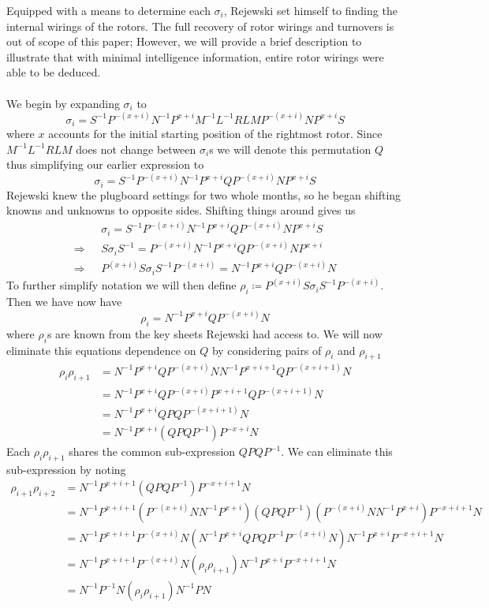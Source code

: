 Equipped with a means to determine each $\sigma_i$, Rejewski set
himself to finding the internal wirings of the rotors. The full
recovery of rotor wirings and turnovers is out of scope of this paper;
However, we will provide a brief description to illustrate that with
minimal intelligence information, entire rotor wirings were able to be deduced.
\\\\We begin by expanding $\sigma_i$ to
\[
	\sigma_i = S^{-1}P^{-(x+i)}N^{-1}P^{x+i}M^{-1}L^{-1}RLMP^{-(x+i)}NP^{x+i}S
\]
where $x$ accounts for the initial starting position of the rightmost rotor.
Since $M^{-1}L^{-1}RLM$ does not change between $\sigma_i$s we will
denote this permutation $Q$ thus simplifying our earlier expression to
\[
	\sigma_i = S^{-1}P^{-(x+i)}N^{-1}P^{x+i}QP^{-(x+i)}NP^{x+i}S
\]
Rejewski knew the plugboard settings for two whole months, so he
began shifting knowns and unknowns to opposite sides. Shifting things
around gives us
\begin{align*}
	                    & \sigma_i = S^{-1}P^{-(x+i)}N^{-1}P^{x+i}QP^{-(x+i)}NP^{x+i}S \\
	\Rightarrow\text{ } & S\sigma_i S^{-1} =
	P^{-(x+i)}N^{-1}P^{x+i}QP^{-(x+i)}NP^{x+i}
	\\
	\Rightarrow\text{ } & P^{(x+i)}S\sigma_i S^{-1}P^{-(x+i)} =
	N^{-1}P^{x+i}QP^{-(x+i)}N
\end{align*}
To further simplify notation we will then define ${\rho_i} \coloneq
	P^{(x+i)}S\sigma_i S^{-1}P^{-(x+i)}$. Then we have now have
\[
	\rho_i = N^{-1}P^{x+i}QP^{-(x+i)}N
\]
where $\rho_i$s are known from the key sheets Rejewski had access to.
We will now eliminate this equations dependence on $Q$ by considering
pairs of $\rho_i$ and $\rho_{i+1}$
\begin{align*}
	\rho_i\rho_{i+1} & = N^{-1}P^{x+i}QP^{-(x+i)}NN^{-1}P^{x+i+1}QP^{-(x+i+1)}N \\
	                 & = N^{-1}P^{x+i}QP^{-(x+i)}P^{x+i+1}QP^{-(x+i+1)}N        \\
	                 & = N^{-1}P^{x+i}QPQP^{-(x+i+1)}N                          \\
	                 & =N^{-1}P^{x+i}(QPQP^{-1})P^{-{x+i}}N
\end{align*}
Each $\rho_i\rho_{i+1}$ shares the common sub-expression $QPQP^{-1}$.
We can eliminate this sub-expression by noting
\begin{align*}
	\rho_{i+1}\rho_{i+2} & = N^{-1}P^{x+i+1}(QPQP^{-1})P^{-{x+i+1}}N
	\\
	                     & =
	N^{-1}P^{x+i+1}(P^{-(x+i)}NN^{-1}P^{x+i})(QPQP^{-1})(P^{-(x+i)}NN^{-1}P^{x+i})P^{-{x+i+1}}N
	\\
	                     & =
	N^{-1}P^{x+i+1}P^{-(x+i)}N(N^{-1}P^{x+i}QPQP^{-1}P^{-(x+i)}N)N^{-1}P^{x+i}P^{-{x+i+1}}N
	\\
	                     & =
	N^{-1}P^{x+i+1}P^{-(x+i)}N(\rho_i\rho_{i+1})N^{-1}P^{x+i}P^{-{x+i+1}}N
	\\
	                     & = N^{-1}P^{-1}N(\rho_i\rho_{i+1})N^{-1}PN
	\\
\end{align*}
